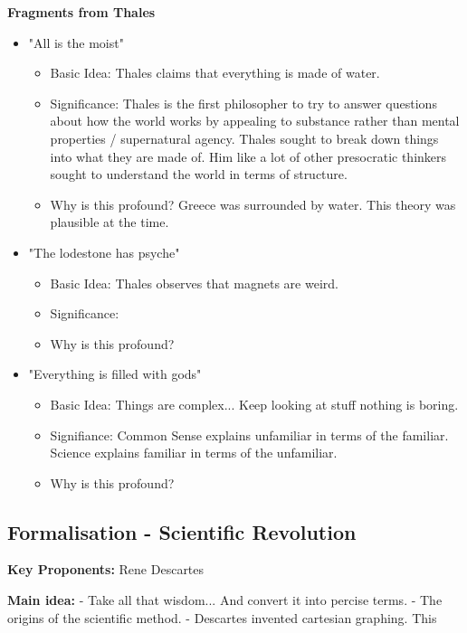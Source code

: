 \documentclass[twoside]{article}
\begin{document}
\textbf{Fragments from Thales}
\begin{itemize}
  \item "All is the moist"
    \begin{itemize}
      \item Basic Idea: Thales claims that everything is made of water.
      \item Significance: Thales is the first philosopher to try to answer questions
            about how the world works by appealing to substance rather than mental
            properties / supernatural agency. Thales sought to break down things into
            what they are made of. Him like a lot of other presocratic thinkers
            sought to understand the world in terms of structure.
      \item Why is this profound? Greece was surrounded by water. This theory
            was plausible at the time.
    \end{itemize}
  \item "The lodestone has psyche"
    \begin{itemize}
      \item Basic Idea: Thales observes that magnets are weird.
      \item Significance:
      \item Why is this profound?
    \end{itemize}
  \item "Everything is filled with gods"
    \begin{itemize}
      \item Basic Idea: Things are complex... Keep looking at stuff nothing is boring.
      \item Signifiance: Common Sense explains unfamiliar in terms of the familiar.
      Science explains familiar in terms of the unfamiliar.
      \item Why is this profound?
    \end{itemize}
\end{itemize}

\subsection{Formalisation - Scientific Revolution}

\textbf{Key Proponents: } Rene Descartes

\textbf{Main idea: }
- Take all that wisdom... And convert it into percise terms.
- The origins of the scientific method.
- Descartes invented cartesian graphing. This
\end{document}
